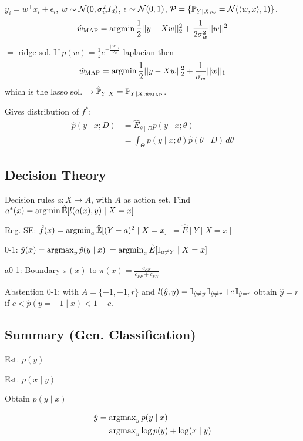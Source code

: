 \begin{definition}[Ex. Reg.]
  \(y_i = w^\top x_i + \epsilon_i\), \(w \sim \normal(0 , \sigma_w^2 I_d)\), \(\epsilon \sim \normal(0, 1)\), \(\mathcal{P} = \{\P_{Y \mid X; w} = \normal(\langle w, x\rangle, 1)\}\).
  \[\hat{w}_{\text{MAP}} = \argmin \frac{1}{2}||y- Xw||_2^2 + \frac{1}{2\sigma_w^2} ||w||^2\]
  \(=\) ridge sol. If \(p(w) = \frac{1}{z}e^{-\frac{||w||_1}{\sigma_w}}\) laplacian then
  \[\hat{w}_{\text{MAP}} = \argmin \frac{1}{2}||y- Xw||_2^2 + \frac{1}{\sigma_w} ||w||_1\]
  which is the lasso sol. \(\to \hat{\P}_{Y \mid X} = \P_{Y \mid X; \hat{w}_{\text{MAP}}}\).
\end{definition}

\begin{definition}
  Gives distribution of \(f^*\):
  \begin{align*}
    \hat{p}(y \mid x; D) &= \hat{E}_{\theta \mid D}p(y \mid x; \theta) \\
    &= \int_\Theta p(y \mid x; \theta) \hat{p}(\theta \mid D) \, d\theta
  \end{align*}
\end{definition}

\subsection{Decision Theory}
Decision rules \(a : X \to A\), with \(A\) as action set.
Find \(a^*(x) = \argmin \hat{\E}[l(a(x), y) \mid X = x]\)

\begin{definition}
  \begin{itemize*}
    \item Reg. SE: \(\hat{f}(x) = \argmin_a \hat{\E}[(Y - a)^2 \mid X=x]\) \(= \hat{E}[Y \mid X = x]\)
    \item 0-1: \(\hat{y}(x) = \argmax_y \hat{p}(y \mid x) \) \(= \argmin_a \hat{E}[\I_{a \neq Y} \mid X = x]\)
    \item a0-1: Boundary \(\pi(x)\) to \(\pi(x) = \frac{c_{FN}}{c_{FP} + c_{FN}}\)
    \item Abstention 0-1: with \(A = \{-1, +1, r\}\) and \(l(\hat{y}, y) = \I_{\hat{y} \neq y}\I_{\hat{y} \neq r} + c \I_{\hat{y} = r}\) obtain \(\hat{y} = r\) if \(c < \hat{p}(y = -1 \mid x) < 1 - c\).
  \end{itemize*}
\end{definition}

\subsection{Summary (Gen. Classification)}
\begin{enumerate*}
  \item Est. \(p(y)\)
  \item Est. \(p(x \mid y)\)
  \item Obtain \(p(y \mid x)\)
\end{enumerate*}
\begin{align*}
  \hat{y} &= \argmax_y p(y \mid x) \\ &= \argmax_y \log p(y) + \log(x \mid y)
\end{align*}